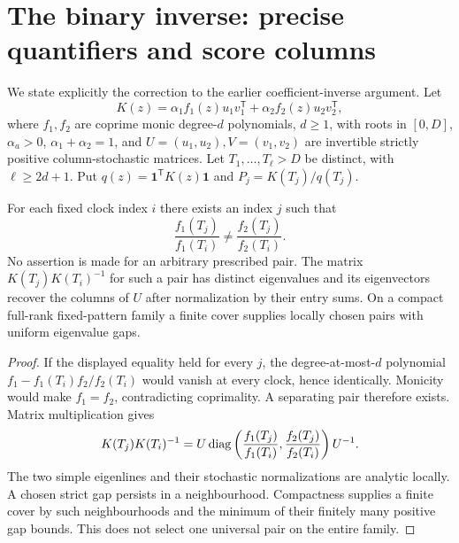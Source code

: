 \section{The binary inverse: precise quantifiers and score columns}\label{app:inverse}
We state explicitly the correction to the earlier coefficient-inverse argument. Let
\[
 K(z)=\alpha_1 f_1(z)u_1v_1^{\mathsf T}+\alpha_2 f_2(z)u_2v_2^{\mathsf T},
\]
where $f_1,f_2$ are coprime monic degree-$d$ polynomials, $d\ge1$, with roots in $[0,D]$, $\alpha_a>0$, $\alpha_1+\alpha_2=1$, and $U=(u_1,u_2),V=(v_1,v_2)$ are invertible strictly positive column-stochastic matrices. Let $T_1,\ldots,T_\ell>D$ be distinct, with $\ell\ge2d+1$. Put $q(z)=\mathbf1^{\mathsf T}K(z)\mathbf1$ and $P_j=K(T_j)/q(T_j)$.

\begin{lemma}\label{lem:clock}
For each fixed clock index $i$ there exists an index $j$ such that
\[
 \frac{f_1(T_j)}{f_1(T_i)}\ne\frac{f_2(T_j)}{f_2(T_i)}.
\]
No assertion is made for an arbitrary prescribed pair. The matrix $K(T_j)K(T_i)^{-1}$ for such a pair has distinct eigenvalues and its eigenvectors recover the columns of $U$ after normalization by their entry sums. On a compact full-rank fixed-pattern family a finite cover supplies locally chosen pairs with uniform eigenvalue gaps.
\end{lemma}
\begin{proof}
If the displayed equality held for every $j$, the degree-at-most-$d$ polynomial
$f_1-f_1(T_i)f_2/f_2(T_i)$ would vanish at every clock, hence identically. Monicity would make $f_1=f_2$, contradicting coprimality. A separating pair therefore exists. Matrix multiplication gives
\[
 K(T_j)K(T_i)^{-1}
 =U\operatorname{diag}\left(\frac{f_1(T_j)}{f_1(T_i)},\frac{f_2(T_j)}{f_2(T_i)}\right)U^{-1}.
\]
The two simple eigenlines and their stochastic normalizations are analytic locally. A chosen strict gap persists in a neighbourhood. Compactness supplies a finite cover by such neighbourhoods and the minimum of their finitely many positive gap bounds. This does not select one universal pair on the entire family.
\end{proof}

